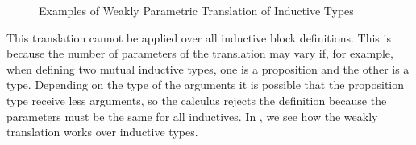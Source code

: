 \begin{figure}
\begin{CoqDef}
                                             
\end{CoqDef}%
    \caption{Examples of Weakly Parametric Translation of Inductive Types}
    \label{fig:IndWTrans}
\end{figure}

This translation cannot be applied over all inductive block definitions. This is because the number of parameters 
of the translation may vary if, for example, when defining two mutual inductive types, one is a proposition 
and the other is a type. Depending on the type of the arguments it is possible that the proposition type receive
less arguments, so the calculus rejects the definition because the parameters must be the same for 
all inductives.
In , we see how the weakly translation works over inductive types.


